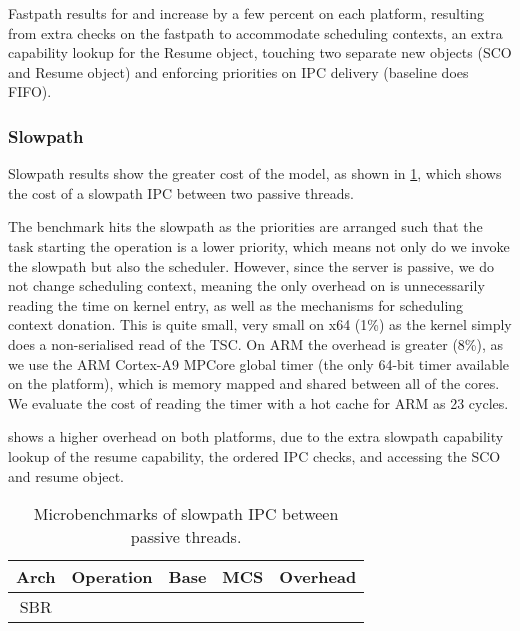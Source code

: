 Fastpath results for \call and \replyrecv increase by a few percent on each platform,
resulting from extra checks on the fastpath to
accommodate scheduling contexts, an extra capability lookup for the Resume object, touching two
separate new objects (\gls{SCO} and Resume object) and enforcing priorities
on IPC delivery (baseline does \gls{FIFO}).

\subsubsection{Slowpath}
\label{eval:slowpath}

Slowpath results show the greater cost of the model, as shown in \cref{t:slowpath-ipc-micro}, 
which shows the cost of a slowpath \gls{IPC} between two passive threads. 

The benchmark hits the slowpath as the priorities are arranged such that the task starting the
operation is a lower priority, which means not only do we invoke the slowpath but also the
scheduler. However, since the server is passive, we do not change scheduling context, meaning the
only overhead on \call is unnecessarily reading the time on kernel entry, as well as the mechanisms
for scheduling context donation. This is quite small, very small on x64 (1\%) as the kernel simply
does a non-serialised read of the \gls{TSC}. On ARM the overhead is greater (8\%), as we use the
ARM Cortex-A9 MPCore global timer (the only 64-bit timer available on the platform), which is memory
mapped and shared between all of the cores. We evaluate the cost of reading the timer with a hot cache 
for ARM as 23 cycles. 

\replyrecv shows a higher overhead on both platforms, due to the extra slowpath capability lookup of
the resume capability, the ordered IPC checks, and accessing the \gls{SCO} and resume object.

\begin{table}[ht]\centering
\begin{tabular}{|c|l| r@{~}l | r@{~}l |r@{~}r|}\hline
\textbf{Arch}           & \multicolumn{1}{c|}{\textbf{Operation}}
                                & \multicolumn{2}{c|}{\textbf{Base}}
                                & \multicolumn{2}{c|}{\textbf{MCS}}
                                & \multicolumn{2}{c|}{\textbf{Overhead}} \\ \hline
\multirow{2}{*}{SBR}

\hline
\multirow{2}{*}{ODX}

\hline
\multirow{2}{*}{x64}

\hline
\end{tabular}
\caption{Microbenchmarks of \selfour slowpath \gls{IPC} between passive threads.}
\label{t:slowpath-ipc-micro}
\end{table}

